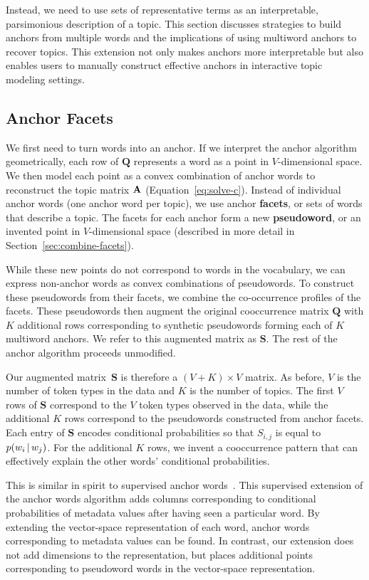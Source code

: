 Instead, we need to use sets of representative terms as an interpretable,
parsimonious description of a topic.
This section discusses strategies to build anchors from multiple words and
the implications of using multiword anchors to recover topics.
This extension not only makes anchors more interpretable but also
enables users to manually construct effective anchors in interactive
topic modeling settings.

\subsection{Anchor Facets}

We first need to turn words into an anchor.
If we interpret the anchor algorithm geometrically, each row of $\bm{Q}$
represents a word as a point in $V$-dimensional space.
We then model each point as a convex
combination of anchor words to
reconstruct the topic matrix $\bf{A}$ (Equation~\ref{eq:solve-c}).
Instead of individual anchor words (one anchor word per topic), we use anchor
{\bf facets}, or sets of words that describe a topic.
The facets for each anchor form a new {\bf pseudoword},
or an invented point in $V$-dimensional space
(described in more detail in Section~\ref{sec:combine-facets}).

While these new points do not correspond to words in the vocabulary,
we can express non-anchor words as convex combinations of
pseudowords.
To construct these pseudowords from their facets, we combine the
co-occurrence profiles of the facets.
These pseudowords then augment the original cooccurrence
matrix $\bm{Q}$ with $K$ additional rows corresponding to synthetic
pseudowords forming each of $K$ multiword anchors.
We refer to this augmented matrix as $\bm{S}$.
The rest of the anchor algorithm proceeds unmodified.

Our augmented matrix~$\bm{S}$ is therefore a $(V+K) \times V$ matrix.
As before, $V$ is the number of token types in the data and $K$ is the number
of topics.
The first $V$ rows of $\bm{S}$ correspond to the $V$ token types observed in the
data, while the additional $K$ rows correspond to the pseudowords constructed
from anchor facets.
Each entry of $\bm{S}$ encodes conditional probabilities so
that $S_{i,j}$ is equal to $p(w_i \, | \, w_j)$.
For the additional $K$ rows, we invent a cooccurrence pattern that can
effectively explain the other words' conditional probabilities.

This is similar in spirit to supervised anchor
words~\cite{supervised-anchors}.
This supervised extension of the anchor words algorithm adds columns
corresponding to conditional probabilities of metadata values after having
seen a particular word.
By extending the vector-space representation of each word, anchor words
corresponding to metadata values can be found.
In contrast, our extension does not add dimensions to the representation, but
places additional points corresponding to pseudoword words in the
vector-space representation.

